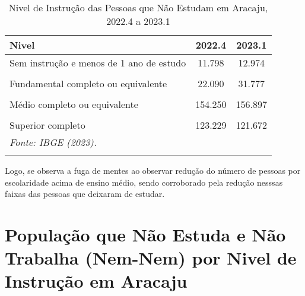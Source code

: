 \documentclass[preprint, 3p,
authoryear]{elsarticle} %
\begin{document}
\begin{longtable}[t]{lcc}
\caption{\label{tab:tab6}\label{tab6}Nivel de Instrução das Pessoas que Não Estudam em Aracaju, 2022.4 a 2023.1}\\
\toprule
Nivel & 2022.4 & 2023.1\\
\midrule
Sem instrução e menos de 1 ano de estudo & 11.798 & 12.974\\
\cellcolor[HTML]{DCDCDC}{Fundamental incompleto ou equivalente} & \cellcolor[HTML]{DCDCDC}{94.121} & \cellcolor[HTML]{DCDCDC}{92.719}\\
Fundamental completo ou equivalente & 22.090 & 31.777\\
\cellcolor[HTML]{DCDCDC}{Médio incompleto ou equivalente} & \cellcolor[HTML]{DCDCDC}{26.680} & \cellcolor[HTML]{DCDCDC}{26.442}\\
Médio completo ou equivalente & 154.250 & 156.897\\
\addlinespace
\cellcolor[HTML]{DCDCDC}{Superior incompleto ou equivalente} & \cellcolor[HTML]{DCDCDC}{19.829} & \cellcolor[HTML]{DCDCDC}{17.383}\\
Superior completo & 123.229 & 121.672\\
\bottomrule
\multicolumn{3}{l}{\rule{0pt}{1em}\textit{Fonte: IBGE (2023).}}\\
\multicolumn{3}{l}{\rule{0pt}{1em}}\\
\end{longtable}
\endgroup{}

Logo, se observa a fuga de mentes ao observar redução do número de
pessoas por escolaridade acima de ensino médio, sendo corroborado pela
redução nesssas faixas das pessoas que deixaram de estudar.

\hypertarget{populauxe7uxe3o-que-nuxe3o-estuda-e-nuxe3o-trabalha-nem-nem-por-nivel-de-instruuxe7uxe3o-em-aracaju}{%
\section{População que Não Estuda e Não Trabalha (Nem-Nem) por Nivel de
Instrução em
Aracaju}\label{populauxe7uxe3o-que-nuxe3o-estuda-e-nuxe3o-trabalha-nem-nem-por-nivel-de-instruuxe7uxe3o-em-aracaju}}

\begingroup\fontsize{9}{11}\selectfont
\end{document}
